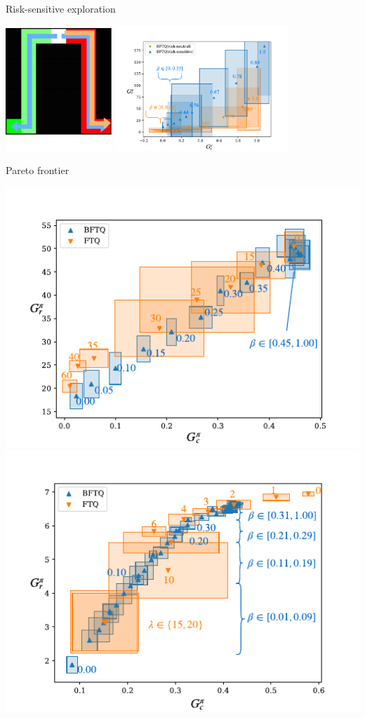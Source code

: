 \documentclass[a0paper,portrait,fontscale=0.355, margin=2cm]{baposter}
\begin{document}
\begin{poster}
{\begin{minipage}{0.49\textwidth}
\centering
Risk-sensitive exploration

\includegraphics[width=0.3\textwidth]{source/img/test.pdf}
\includegraphics[page=1, width=0.49\textwidth]{source/img/corridors}
\end{minipage}
\begin{minipage}{0.5\textwidth}
\centering
Pareto frontier

\includegraphics[width=0.49\linewidth]{../source/img/slot-filling}
\includegraphics[width=0.49\linewidth]{../source/img/highway}
\end{minipage}
}




\end{poster}
\end{document}
